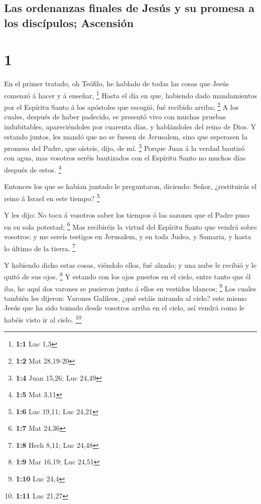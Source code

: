 \hypertarget{las-ordenanzas-finales-de-jesuxfas-y-su-promesa-a-los-discuxedpulos-ascensiuxf3n}{%
\subsection{Las ordenanzas finales de Jesús y su promesa a los
discípulos;
Ascensión}\label{las-ordenanzas-finales-de-jesuxfas-y-su-promesa-a-los-discuxedpulos-ascensiuxf3n}}

\hypertarget{section}{%
\section{1}\label{section}}

 En el primer tratado, oh Teófilo, he hablado de todas las
cosas que Jesús comenzó á hacer y á enseñar, \footnote{\textbf{1:1} Luc
  1,3}  Hasta el día en que, habiendo dado mandamientos por
el Espíritu Santo á los apóstoles que escogió, fué recibido arriba;
\footnote{\textbf{1:2} Mat 28,19-20}  A los cuales, después
de haber padecido, se presentó vivo con muchas pruebas indubitables,
apareciéndoles por cuarenta días, y hablándoles del reino de Dios.
 Y estando juntos, les mandó que no se fuesen de Jerusalem,
sino que esperasen la promesa del Padre, que oísteis, dijo, de mí.
\footnote{\textbf{1:4} Juan 15,26; Luc 24,49}  Porque Juan á
la verdad bautizó con agua, mas vosotros seréis bautizados con el
Espíritu Santo no muchos días después de estos. \footnote{\textbf{1:5}
  Mat 3,11}

 Entonces los que se habían juntado le preguntaron,
diciendo: Señor, ¿restituirás el reino á Israel en este tiempo?
\footnote{\textbf{1:6} Luc 19,11; Luc 24,21}

 Y les dijo: No toca á vosotros saber los tiempos ó las
sazones que el Padre puso en su sola potestad; \footnote{\textbf{1:7}
  Mat 24,36}  Mas recibiréis la virtud del Espíritu Santo
que vendrá sobre vosotros; y me sereís testigos en Jerusalem, y en toda
Judea, y Samaria, y hasta lo último de la tierra. \footnote{\textbf{1:8}
  Hech 8,11; Luc 24,48}

 Y habiendo dicho estas cosas, viéndolo ellos, fué alzado; y
una nube le recibió y le quitó de sus ojos. \footnote{\textbf{1:9} Mar
  16,19; Luc 24,51}  Y estando con los ojos puestos en el
cielo, entre tanto que él iba, he aquí dos varones se pusieron junto á
ellos en vestidos blancos; \footnote{\textbf{1:10} Luc 24,4}
 Los cuales también les dijeron: Varones Galileos, ¿qué
estáis mirando al cielo? este mismo Jesús que ha sido tomado desde
vosotros arriba en el cielo, así vendrá como le habéis visto ir al
cielo. \footnote{\textbf{1:11} Luc 21,27}

